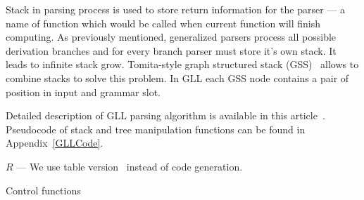 Stack in parsing process is used to store return information for the parser --- a name of function which would be called when current function will finish computing. 
As previously mentioned, generalized parsers process all possible derivation branches and for every branch parser must store it's own stack. It leads to infinite stack grow.  
Tomita-style graph structured stack (GSS)~\cite{Tomita} allows to combine stacks to solve this problem.
In GLL each GSS node contains a pair of position in input and grammar slot. 

Detailed description of GLL parsing algorithm is available in this article~\cite{GLL}. Pseudocode of stack and tree manipulation functions can be found in Appendix~\ref{GLLCode}.

$R$ ---   
We use table version~\cite{TableGLL} instead of code generation.

\begin{algorithm}[h]
\begin{algorithmic}[1]
\caption{Control functions}
\label{mainFunctions}
  \Else
  \EndIf
\EndFunction

       \Else 
       \EndIf
       \EndIf
  \EndCase
       \EndFor
  \EndCase
  \EndCase
  \EndCase
  \EndSwitch
\EndFunction

      \Else
      \EndIf
  \EndWhile
\EndFunction

\end{algorithmic}
\end{algorithm}

